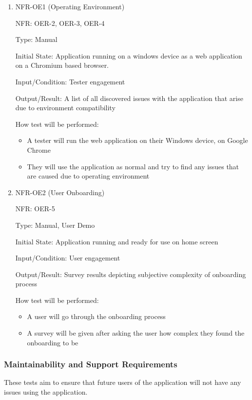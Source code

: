 \documentclass[12pt, titlepage]{article}
\begin{document}
\begin{enumerate}

\item{NFR-OE1 (Operating Environment)\\}

NFR: OER-2, OER-3, OER-4

Type: Manual

Initial State: Application running on a windows device as a web application on a
Chromium based browser.

Input/Condition: Tester engagement

Output/Result: A list of all discovered issues with the application that arise
due to environment compatibility

How test will be performed: 
\begin{itemize}
  \item A tester will run the web application on their Windows device, on Google
  Chrome
  \item They will use the application as normal and try to find any issues that
  are caused due to operating environment
\end{itemize}
					
\item{NFR-OE2 (User Onboarding)\\}

NFR: OER-5

Type: Manual, User Demo

Initial State: Application running and ready for use on home screen

Input/Condition: User engagement

Output/Result: Survey results depicting subjective complexity of onboarding
process

How test will be performed: 
\begin{itemize}
  \item A user will go through the onboarding process
  \item A survey will be given after asking the user how complex they found the onboarding to be
\end{itemize}
\end{enumerate}

\subsubsection{Maintainability and Support Requirements}
These tests aim to ensure that future users of the application will not have any
issues using the application. 
\end{document}
